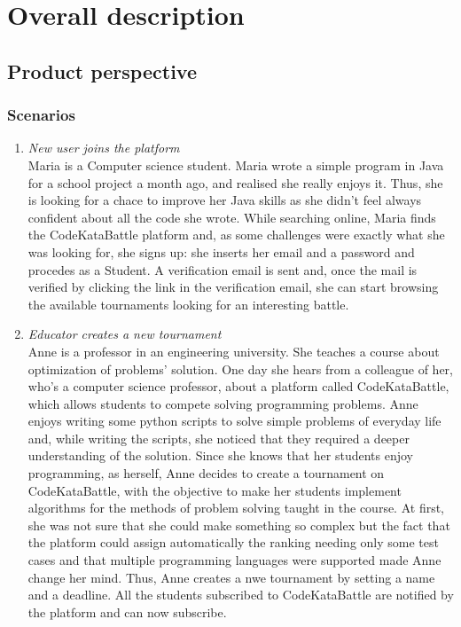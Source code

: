 \documentclass[12pt, a4paper]{report}
\begin{document}
\newpage 

\chapter{Overall description}
    \section{Product perspective}
    \subsection{Scenarios}
    \begin{enumerate}
        \item \textit{New user joins the platform}\\
        Maria is a Computer science student. Maria wrote a simple program in Java for a school project a month ago,
        and realised she really enjoys it. Thus, she is looking for a chace to improve her Java skills as she didn't feel always confident about all the code she wrote.
        While searching online, Maria finds the CodeKataBattle platform and, as some challenges were exactly what she was looking for, she signs up: she inserts her email and a password and procedes as a Student.
        A verification email is sent and, once the mail is verified by clicking the link in the verification email, she can start browsing the available tournaments looking for an interesting battle.
        
        \item \textit{Educator creates a new tournament} \\
        Anne is a professor in an engineering university.
        She teaches a course about optimization of problems' solution.
        One day she hears from a colleague of her, who's a computer science professor, about a platform called CodeKataBattle,
        which allows students to compete solving programming problems.
        Anne enjoys writing some python scripts to solve simple problems of everyday life and,
        while writing the scripts, she noticed that they required a deeper understanding of the solution.
        Since she knows that her students enjoy programming, as herself, Anne decides to create a tournament on CodeKataBattle,
        with the objective to make her students implement algorithms for the methods of problem solving taught in the course.
        At first, she was not sure that she could make something so complex but the fact that the platform could assign automatically 
        the ranking needing only some test cases and that multiple programming languages were supported made Anne change her mind.
        Thus, Anne creates a nwe tournament by setting a name and a deadline. All the students subscribed to CodeKataBattle are notified
        by the platform and can now subscribe.


\end{enumerate}
\end{document}
